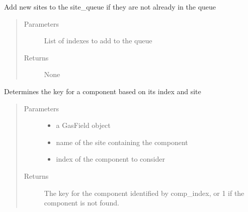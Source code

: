\documentclass[letterpaper,10pt,english]{sphinxmanual}
\begin{document}
\begin{fulllineitems}
\begin{fulllineitems}
\label{\detokenize{index:feast.DetectionModules.abstract_detection_method.DetectionMethod.extend_site_queue}}
Add new sites to the site\_queue if they are not already in the queue
\begin{quote}\begin{description}
\item[{Parameters}] \leavevmode
{} \textendash{} List of indexes to add to the queue

\item[{Returns}] \leavevmode
None

\end{description}\end{quote}

\end{fulllineitems}


\begin{fulllineitems}
\label{\detokenize{index:feast.DetectionModules.abstract_detection_method.DetectionMethod.find_comp_name}}
Determines the key for a component based on its index and site
\begin{quote}\begin{description}
\item[{Parameters}] \leavevmode\begin{itemize}
\item {} 
 \textendash{} a GasField object

\item {} 
 \textendash{} name of the site containing the component

\item {} 
 \textendash{} index of the component to consider

\end{itemize}

\item[{Returns}] \leavevmode
The key for the component identified by comp\_index, or \sphinxhyphen{}1 if the component is not found.


\end{description}
\end{quote}
\end{fulllineitems}
\end{fulllineitems}
\end{document}
